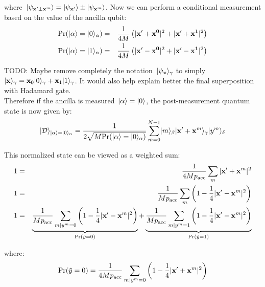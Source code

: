 \documentclass{article}
\DeclarePairedDelimiter\ket{\lvert}{\rangle}
\begin{document}
\noindent where~$\ket{\psi_{ {\bf x^\prime} \pm {\bf x}^m }} = \ket{\psi_{ {\bf x}^\prime  }} \pm \ket{\psi_{ {\bf x}^m  }} $.  Now we can perform a conditional measurement based on the value of the ancilla qubit:
\begin{eqnarray*}
\mbox{Pr} (\ket{\alpha} = \ket{0}_\alpha) &=& \frac{1}{4M} \left( \vert {\bf x}^\prime + {\bf x^0} \vert^2 + \vert {\bf x}^\prime + {\bf x^1} \vert^2  \right) \\
\mbox{Pr} (\ket{\alpha} = \ket{1}_\alpha) &=& \frac{1}{4M} \left( \vert {\bf x}^\prime - {\bf x^0} \vert^2 + \vert {\bf x}^\prime - {\bf x^1} \vert^2  \right)
\end{eqnarray*}

\noindent TODO:  Maybe remove completely the notation~$\ket{\psi_{\bf x}}_\gamma$ to simply~$\ket{{\bf x}}_\gamma = {\bf x}_0 \ket{0}_\gamma + {\bf x}_1 \ket{1}_\gamma$.  It would also help explain better the final superposition with Hadamard gate. \\

\noindent Therefore if the ancilla is measured~$\ket{\alpha} = \ket{0}$, the post-measurement quantum state is now given by:
\begin{equation}
\ket{\mathcal{D}}_{\ket{\alpha} = \ket{0}_\alpha} = \frac{1}{2 \sqrt{M \mbox{Pr} (\ket{\alpha} = \ket{0}_\alpha) }} \sum_{m=0}^{N-1} \ket{m}_\beta \ket{{\bf x}^\prime + {\bf x}^m }_\gamma \ket{y^m}_\delta
\end{equation}

\noindent This normalized state can be viewed as a weighted sum:
\begin{eqnarray*}
1 &=& \frac{1}{4 M p_{\text{acc}}} \sum_m | {\bf x}^\prime + {\bf x}^m |^2  \\
1 &=& \frac{1}{M p_{\text{acc}}} \sum_m \left( 1 - \frac{1}{4} | {\bf x}^\prime - {\bf x}^m |^2 \right) \\
1 &=& \underbrace{\frac{1}{M p_{\text{acc}}} \sum_{m|y^m=0} \left( 1 - \frac{1}{4} | {\bf x}^\prime - {\bf x}^m |^2 \right)}_{\text{Pr}(\tilde{y} = 0)} + \underbrace{\frac{1}{M p_{\text{acc}}} \sum_{m|y^m=1} \left( 1 - \frac{1}{4} | {\bf x}^\prime - {\bf x}^m |^2 \right)}_{\text{Pr}(\tilde{y} = 1)}
\end{eqnarray*}

\noindent where:
\begin{equation}
\text{Pr}(\tilde{y} = 0) = \frac{1}{4 M p_{\text{acc}}} \sum_{m|y^m=0} \left( 1 - \frac{1}{4} | {\bf x}^\prime + {\bf x}^m |^2 \right)
\label{eq:confidenceClassifier}
\end{equation}
\end{document}
